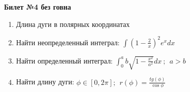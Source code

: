 \documentclass[a4paper, 12pt]{article}
\begin{document}
\begin{center}
	\textbf{Билет №4 без говна}
\end{center}
\begin{enumerate}
	\item Длина дуги в полярных координатах
	\item Найти неопределенный интеграл: $\int{(1-\frac{2}{x})^2 e^xdx}$
	\item Найти определенный интеграл: $\int^{a}_{0}{b\sqrt{1 - \frac{x^2}{a^2}}dx} \ ; \ \ a > b$
	\item Найти длину дуги: $\phi \in [0, 2\pi] ;\ \  r(\phi) = \frac{tg(\phi)}{\cos{\phi}}$
	
\end{enumerate}
\end{document}
